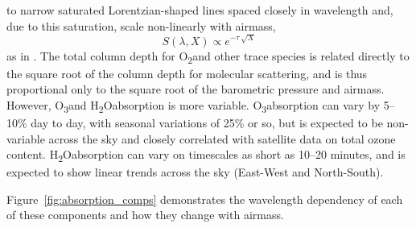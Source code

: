 \documentclass[12pt,preprint]{aastex}
\newcommand{\water}   {H\textsubscript{2}O}
\newcommand{\ozone}    {O\textsubscript{3}}
\newcommand{\oxy}     {O\textsubscript{2}}
\begin{document}
\begin{itemize}
{to narrow saturated Lorentzian-shaped lines spaced closely in
wavelength and, due to this saturation, scale non-linearly with
airmass, 
\begin{equation}
S(\lambda, X) \propto e^{-\tau\,\sqrt X}
\end{equation} 
as in \citep{Stubbs2007b}. The total column depth for \oxy and other
trace species is related directly to the square root of the column depth for molecular
scattering, and is thus proportional only to the square root of the
barometric pressure and airmass. However, \ozone and \water absorption
is more variable. \ozone absorption can vary by
5--10\% day to day, with seasonal variations of 25\% or so, but is
expected to be non-variable across the sky and closely correlated with
satellite data on total ozone content. \water absorption can vary on timescales as short as
10--20 minutes, and is expected to show linear trends across the sky
(East-West and North-South). 
}
\end{itemize}
Figure~\ref{fig:absorption_comps} demonstrates the
wavelength dependency of each of these components and how they change
with airmass. 
\end{document}
